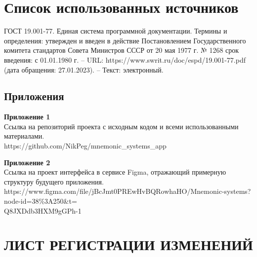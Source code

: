 \documentclass[draft]{article}
\newcommand\zz[1]{\par{\normalsize\strut #1} \hfill\ignorespaces}
\begin{document}
\section*{Список использованных источников}
\begin{thebibliography}{}
 ГОСТ 19.001-77. Единая система программной документации. Термины и определения: утвержден и введен в действие Постановлением Государственного комитета стандартов Совета Министров СССР от 20 мая 1977 г. № 1268 срок введения: с 01.01.1980 г. – URL: https://www.swrit.ru/doc/espd/19.001-77.pdf (дата обращения: 27.01.2023). – Текст: электронный.
\end{thebibliography}
\newpage
\begin{center}
\section*{Приложения}
\end{center}
\zz{}\textbf{Приложение 1\\}
Ссылка на репозиторий проекта с исходным кодом и всеми использованными материалами.\\
https://github.com/NikPeg/mnemonic\_systems\_app\\
\zz{}\textbf{Приложение 2\\}
Ссылка на проект интерфейса в сервисе Figma, отражающий примерную структуру будущего приложения.\\
https://www.figma.com/file/jBcJmt0PREwHvBQRowhaHO/Mnemonic-systems?node-id=38\%3A250\&t=\\
Q8JXDdb3HXM9gGPh-1\\
\newpage
\section*{ЛИСТ РЕГИСТРАЦИИ ИЗМЕНЕНИЙ}
\end{document}
